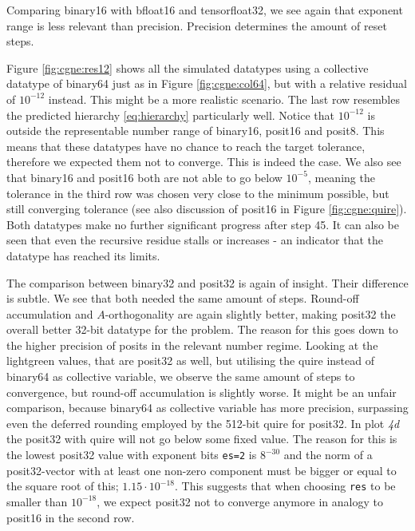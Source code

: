 \documentclass{article}
\theoremstyle{plain} %
\theoremstyle{convention} %
\theoremstyle{remark} %
\def\code#1{\texttt{#1}}
\numberwithin{equation}{section}
\begin{document}
Comparing \gls{binary16} with \gls{bfloat16} and \gls{tensorfloat32}, we see again that exponent range is less relevant than precision. Precision determines the amount of reset steps.

Figure \ref{fig:cgne:res12} shows all the simulated datatypes using a collective datatype of \gls{binary64} just as in Figure \ref{fig:cgne:col64}, but with a relative residual of $10^{-12}$ instead. This might be a more realistic scenario. The last row resembles the predicted hierarchy \eqref{eq:hierarchy} particularly well. Notice that $10^{-12}$ is outside the representable number range of \gls{binary16}, \gls{posit16} and \gls{posit8}. This means that these datatypes have no chance to reach the target tolerance, therefore we expected them not to converge. This is indeed the case. We also see that \gls{binary16} and \gls{posit16} both are not able to go below $10^{-5}$, meaning the tolerance in the third row was chosen very close to the minimum possible, but still converging tolerance (see also discussion of \gls{posit16} in Figure \ref{fig:cgne:quire}). Both datatypes make no further significant progress after step \num{45}. It can also be seen that even the recursive residue stalls or increases - an indicator that the datatype has reached its limits.

The comparison between \gls{binary32} and \gls{posit32} is again of insight. Their difference is subtle. We see that both needed the same amount of steps. Round-off accumulation and $A$-orthogonality are again slightly better, making \gls{posit32} the overall better \num{32}-bit datatype for the problem. The reason for this goes down to the higher precision of posits in the relevant number regime. Looking at the \textcolor{clightgreen}{lightgreen} values, that are \gls{posit32} as well, but utilising the \gls{quire} instead of \gls{binary64} as collective variable, we observe the same amount of steps to convergence, but round-off accumulation is slightly worse. It might be an unfair comparison, because \gls{binary64} as collective variable has more precision, surpassing even the deferred rounding employed by the \num{512}-bit \gls{quire} for \gls{posit32}. In plot \textit{4d} the \gls{posit32} with \gls{quire} will not go below some fixed value. The reason for this is the lowest \gls{posit32} value with exponent bits \code{es=2} is $8^{-30}$ and the norm of a \gls{posit32}-vector with at least one non-zero component must be bigger or equal to the square root of this; $1.15 \cdot 10^{-18}$. This suggests that when choosing \code{res} to be smaller than $10^{-18}$, we expect \gls{posit32} not to converge anymore in analogy to \gls{posit16} in the second row.
\end{document}
